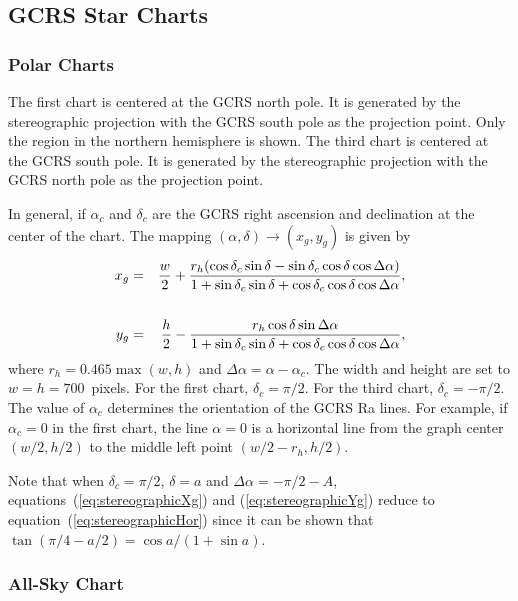\documentclass[12pt]{article}
\newcommand \beqn {\begin{eqnarray}}
\newcommand \eeqn {\end{eqnarray}}
\begin{document}
\subsection{GCRS Star Charts}

\subsubsection{Polar Charts} 

The first chart is centered at the GCRS north pole. It is generated by 
the stereographic projection with the GCRS south pole as the projection 
point. Only the region in the northern hemisphere is shown. The third chart 
is centered at the GCRS south pole. It is generated by the stereographic projection 
with the GCRS north pole as the projection point. 

In general, if $\alpha_c$ and $\delta_c$ are the GCRS right ascension and declination 
at the center of the chart. The mapping $(\alpha,\delta) \rightarrow (x_g,y_g)$ is 
given by 
\beqn
  x_g &=& \frac{w}{2} + \frac{r_h (\cos \delta_c \sin \delta 
- \sin \delta_c \cos \delta \cos \Delta \alpha )}{1 + \sin \delta_c \sin \delta 
+ \cos \delta_c \cos \delta \cos \Delta \alpha} ,
\label{eq:stereographicXg} \\ \cr
  y_g &=& \frac{h}{2} - \frac{r_h \cos \delta \sin \Delta \alpha}{1 + 
\sin \delta_c \sin \delta + \cos \delta_c \cos \delta \cos \Delta \alpha} , 
\label{eq:stereographicYg}
\eeqn
where $r_h = 0.465\max(w,h)$ and $\Delta \alpha = \alpha - \alpha_c$. 
The width and height are set to $w=h=700$~pixels.
For the first chart, $\delta_c=\pi/2$. For the third chart, $\delta_c=-\pi/2$. 
The value of $\alpha_c$ determines the orientation of the GCRS Ra lines. 
For example, if $\alpha_c=0$ in the first chart, the line $\alpha=0$ 
is a horizontal line from the graph center $(w/2,h/2)$ to the 
middle left point $(w/2 - r_h, h/2)$. 

Note that when $\delta_c=\pi/2$, $\delta = a$ and $\Delta \alpha = -\pi/2 - A$, 
equations~(\ref{eq:stereographicXg}) and (\ref{eq:stereographicYg}) reduce 
to equation~(\ref{eq:stereographicHor}) since it can be shown that 
$\tan(\pi/4 - a/2) = \cos a/(1+\sin a)$.

\subsubsection{All-Sky Chart} 
\end{document}
